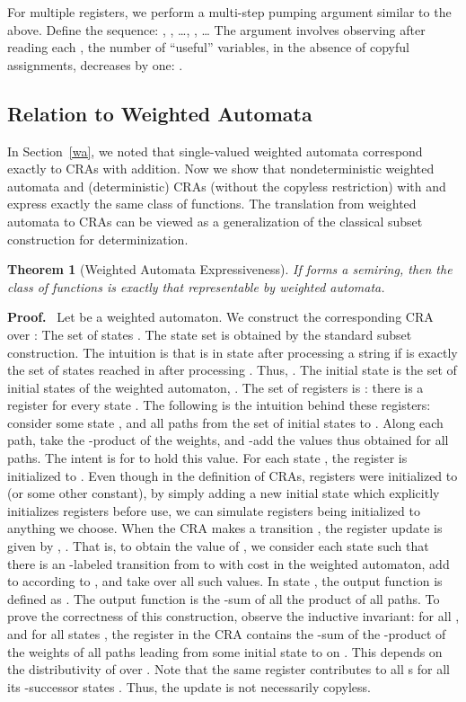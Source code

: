 \documentclass[11pt]{article}
\newtheorem{theorem}{Theorem}
\def\Proof{{\bf Proof.}}
\def\qed{{\bf }}
\newcommand{\mypar}[1]{\subsection{#1}}
\def\qed{{\bf }}
\begin{document}
For multiple registers, we perform a multi-step pumping argument similar
to the above. Define the sequence: ,
, \ldots{},
,
\ldots{} The argument involves observing after reading each ,
the number of ``useful'' variables, in the absence of copyful assignments,
decreases by one: .
\qed

\mypar{Relation to Weighted Automata}
In Section~\ref{wa}, we noted that single-valued weighted automata correspond exactly to
CRAs with addition. Now we show that nondeterministic weighted automata and
(deterministic) CRAs (without the copyless restriction)
with  and  express exactly the same class of functions.
The translation from weighted automata to CRAs can be viewed
as a generalization of the classical subset construction for determinization.

\begin{theorem}[Weighted Automata Expressiveness]\label{wa-cra}
If  forms a semiring, then the
class of functions 
is exactly that representable by weighted automata.
\end{theorem}
\Proof~
Let  be a weighted
automaton. We construct the corresponding CRA  over :
The set of states . The state set is obtained by the standard
subset construction. The intuition is that  is in state 
after processing a string  if  is exactly the set of states
reached in  after processing . Thus, .
The initial state  is the set of initial states of the weighted
automaton, .
The set of registers is : there
is a register  for every state . The following is the intuition behind these registers: consider some state , and all paths from the set of initial states  to . Along each path, take the -product of the weights, and -add the values thus obtained for all paths. The intent is for  to hold this value.
For each state , the register  is initialized to
. Even though in the definition of CRAs, registers were initialized to  (or some other constant), by simply adding a new initial state which explicitly initializes registers before use, we can simulate registers being initialized to anything we choose.
When the CRA makes a transition , the register
update is given by , .
That is, to obtain the value of , we consider each
state  such that there is an -labeled transition from 
to  with cost  in the weighted automaton, add 
to  according to , and take  over all such
values.
In state , the output function is defined as .
The output function is the -sum of all the product of all
paths.
To prove the correctness of this construction, observe the inductive
invariant: for all , and for all states , the register 
in the CRA  contains the -sum of the -product
of the weights of all paths leading from some initial state to 
on . This depends on the distributivity of  over .
Note that the same register  contributes to all s
for all its -successor states . Thus, the update
is not necessarily copyless.
\end{document}

